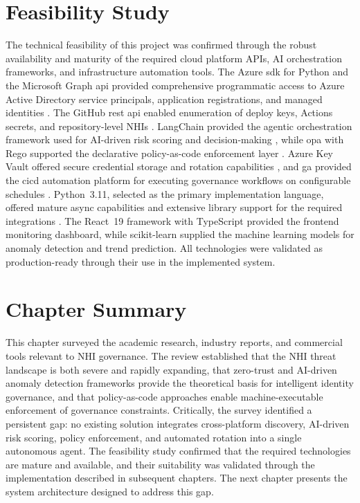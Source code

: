 \section[Feasibility Study]{\textbf{Feasibility Study}}
The technical feasibility of this project was confirmed through the robust availability and maturity of the required cloud platform APIs, AI orchestration frameworks, and infrastructure automation tools. The Azure \gls{sdk} for Python and the Microsoft Graph \gls{api} provided comprehensive programmatic access to Azure Active Directory service principals, application registrations, and managed identities \cite{AzureSDKPython, MSGraphAPI}. The GitHub \gls{rest} \gls{api} enabled enumeration of deploy keys, Actions secrets, and repository-level NHIs \cite{GitHubRESTAPI}. LangChain provided the agentic orchestration framework used for AI-driven risk scoring and decision-making \cite{LangChainDocs}, while \gls{opa} with Rego supported the declarative policy-as-code enforcement layer \cite{OPADocs2024}. Azure Key Vault offered secure credential storage and rotation capabilities \cite{AzureKeyVault}, and \gls{ga} provided the \gls{cicd} automation platform for executing governance workflows on configurable schedules \cite{GitHubActions2024}. Python~3.11, selected as the primary implementation language, offered mature async capabilities and extensive library support for the required integrations \cite{Python311}. The React~19 framework with TypeScript provided the frontend monitoring dashboard, while scikit-learn supplied the machine learning models for anomaly detection and trend prediction. All technologies were validated as production-ready through their use in the implemented system.

\section*{Chapter Summary}
This chapter surveyed the academic research, industry reports, and commercial tools relevant to NHI governance. The review established that the NHI threat landscape is both severe and rapidly expanding, that zero-trust and AI-driven anomaly detection frameworks provide the theoretical basis for intelligent identity governance, and that policy-as-code approaches enable machine-executable enforcement of governance constraints. Critically, the survey identified a persistent gap: no existing solution integrates cross-platform discovery, AI-driven risk scoring, policy enforcement, and automated rotation into a single autonomous agent. The feasibility study confirmed that the required technologies are mature and available, and their suitability was validated through the implementation described in subsequent chapters. The next chapter presents the system architecture designed to address this gap.
